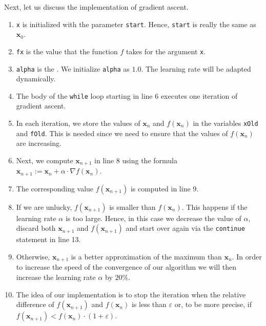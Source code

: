 Next, let us discuss the implementation of gradient ascent.
\begin{enumerate}
\item \texttt{x} is initialized with the parameter \texttt{start}.  Hence, \texttt{start} is really the same as
      $\mathbf{x}_0$. 
\item \texttt{fx} is the value that the function $f$ takes for the argument \texttt{x}.
\item \texttt{alpha} is the .  We initialize \texttt{alpha} as $1.0$.  The learning rate
      will be adapted dynamically. 
\item The body of the \texttt{while} loop starting in line 6 executes one iteration of gradient ascent.
\item In each iteration, we store the values of $\mathbf{x}_n$ and $f(\mathbf{x}_n)$ in the variables
      \texttt{xOld} and \texttt{fOld}.  This is needed since we need to ensure that the values of
      $f(\mathbf{x}_n)$ are increasing.
\item Next, we compute $\mathbf{x}_{n+1}$ in line 8 using the formula
      \\[0.2cm]
      \hspace*{1.3cm}
      $\mathbf{x}_{n+1} := \mathbf{x}_n + \alpha \cdot \nabla f(\mathbf{x}_n)$.
\item The corresponding value $f(\mathbf{x}_{n+1})$ is computed in line 9.
\item If we are unlucky, $f(\mathbf{x}_{n+1})$ is smaller than $f(\mathbf{x}_{n})$.  This happens if the learning
      rate $\alpha$ is too large.  Hence, in this case we decrease the value of $\alpha$, discard 
      both $\mathbf{x}_{n+1}$ and $f(\mathbf{x}_{n+1})$ and start over again via the \texttt{continue}
      statement in line 13.
\item Otherwise, $\mathbf{x}_{n+1}$ is a better approximation of the maximum than $\mathbf{x}_n$.  
      In order to increase the speed of the convergence of our algorithm we will then increase the learning rate
      $\alpha$ by $20\%$.    
\item The idea of our implementation is to stop the iteration when the relative difference  of 
      $f(\mathbf{x}_{n+1})$ and $f(\mathbf{x}_{n})$ is less than $\varepsilon$ or, to be more precise, if
      \\[0.2cm]
      \hspace*{1.3cm}
      $f(\mathbf{x}_{n+1}) < f(\mathbf{x}_{n}) \cdot (1 + \varepsilon)$.
      \\[0.2cm]

\end{enumerate}
